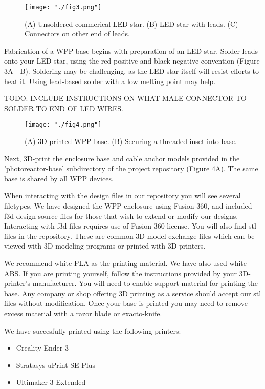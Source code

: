 \documentclass[11pt]{article}
\begin{document}
\begin{figure}[H]
	\texttt{[image: "./fig3.png"]}
	\caption{(A) Unsoldered commerical LED star. (B) LED star with leads. (C) Connectors on other end of leads.}
\end{figure}

Fabrication of a WPP base begins with preparation of an LED star.
Solder leads onto your LED star, using the red positive and black negative convention (Figure 3A---B).
Soldering may be challenging, as the LED star itself will resist efforts to heat it.
Using lead-based solder with a low melting point may help.

TODO: INCLUDE INSTRUCTIONS ON WHAT MALE CONNECTOR TO SOLDER TO END OF LED WIRES.

\begin{figure}[H]
	\texttt{[image: "./fig4.png"]}
	\caption{(A) 3D-printed WPP base. (B) Securing a threaded inset into base.}
\end{figure}

Next, 3D-print the enclosure base and cable anchor models provided in the 'photoreactor-base' subdirectory of the project repository (Figure 4A).
The same base is shared by all WPP devices.

When interacting with the design files in our repository you will see several filetypes.
We have designed the WPP enclosure using Fusion 360, and included f3d design source files for those that wish to extend or modify our designs.
Interacting with f3d files requires use of Fusion 360 license.
You will also find stl files in the repository.
These are common 3D-model exchange files which can be viewed with 3D modeling programs or printed with 3D-printers.

\clearpage

We recommend white PLA as the printing material. We have also used white ABS.
If you are printing yourself, follow the instructions provided by your 3D-printer's manufacturer.
You will need to enable support material for printing the base.
Any company or shop offering 3D printing as a service should accept our stl files without modification.
Once your base is printed you may need to remove excess material with a razor blade or exacto-knife.

We have succesfully printed using the following printers:

\begin{itemize}
	\item Creality Ender 3
	\item Stratasys uPrint SE Plus
	\item Ultimaker 3 Extended
\end{itemize}
\end{document}
